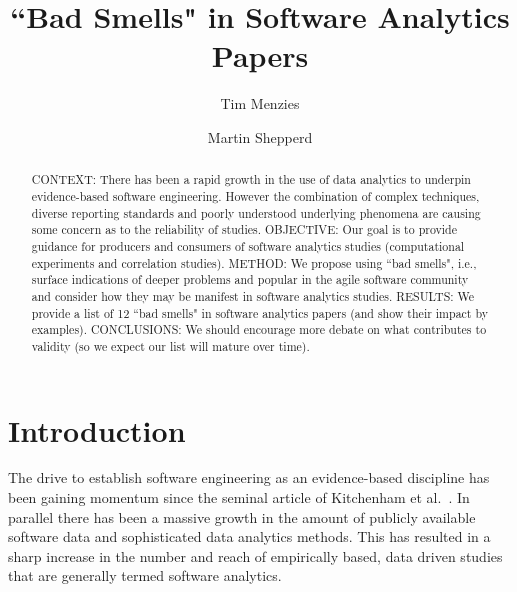 \documentclass[preprint,10pt]{elsarticle}
\newcommand{\RED}{\color{red}}
\newcommand{\BLACK}{\color{black}}
\begin{document}
\begin{frontmatter}

\title{``Bad Smells" in Software Analytics Papers}
\author{Tim Menzies}
\address{Dept.\ of Computer Science\\North Carolina State University, USA}
\author{Martin Shepperd}
\address{Brunel Software Engineering Lab (BSEL)\\Dept.\ of Computer Science\\Brunel University London\\ UB8 3PH, UK}


\begin{abstract}
CONTEXT:  There has been a rapid growth in the use of data analytics to underpin evidence-based software engineering.  However the combination of complex techniques, diverse reporting standards and poorly understood underlying phenomena are causing some concern as to the reliability of studies.\newline
OBJECTIVE: Our goal is to provide guidance for producers and consumers of software analytics studies (computational experiments and correlation studies).\newline
METHOD: We propose using ``bad smells", i.e., surface indications of deeper problems and popular in the agile software community and consider how they may be manifest in software analytics studies.\newline
RESULTS: We provide a list of 12 ``bad smells" in software analytics papers (and show their impact by examples).\newline 
CONCLUSIONS: We should encourage more debate on what  \RED contributes to validity \BLACK  (so we expect our list will mature over time).
\end{abstract}

\end{frontmatter}

\maketitle

\section{Introduction}


\noindent
The drive to establish software engineering as an evidence-based discipline has been gaining momentum since the seminal article of Kitchenham et al.~\cite{Kitc04}.  In parallel there has been a massive growth in the amount of publicly available software data and sophisticated data analytics methods.  This has resulted in a sharp increase in the number and reach of empirically based, data driven studies that are generally termed software analytics.
\end{document}
